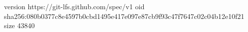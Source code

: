 version https://git-lfs.github.com/spec/v1
oid sha256:080b0377c8e4597b0cbd1495e417e097e87cb9f93c47f7647c02c04b12e10f21
size 43840

